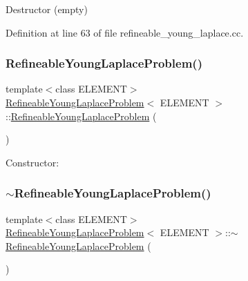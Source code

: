 Destructor (empty) 



Definition at line 63 of file refineable\+\_\+young\+\_\+laplace.\+cc.

\mbox{\label{classRefineableYoungLaplaceProblem_a78f77a299f2770a82378fcccf86a0b71}} 
\subsubsection{\texorpdfstring{Refineable\+Young\+Laplace\+Problem()}{RefineableYoungLaplaceProblem()}\hspace{0.1cm}{\footnotesize\ttfamily [3/3]}}
{\footnotesize\ttfamily template$<$class E\+L\+E\+M\+E\+NT$>$ \\
\hyperlink{classRefineableYoungLaplaceProblem}{Refineable\+Young\+Laplace\+Problem}$<$ E\+L\+E\+M\+E\+NT $>$\+::\hyperlink{classRefineableYoungLaplaceProblem}{Refineable\+Young\+Laplace\+Problem} (\begin{DoxyParamCaption}{ }\end{DoxyParamCaption})}



Constructor\+: 

\mbox{\label{classRefineableYoungLaplaceProblem_a24b45d5ecdd1d7dbb678e7f74777bf41}} 
\subsubsection{\texorpdfstring{$\sim$\+Refineable\+Young\+Laplace\+Problem()}{~RefineableYoungLaplaceProblem()}\hspace{0.1cm}{\footnotesize\ttfamily [3/3]}}
{\footnotesize\ttfamily template$<$class E\+L\+E\+M\+E\+NT$>$ \\
\hyperlink{classRefineableYoungLaplaceProblem}{Refineable\+Young\+Laplace\+Problem}$<$ E\+L\+E\+M\+E\+NT $>$\+::$\sim$\hyperlink{classRefineableYoungLaplaceProblem}{Refineable\+Young\+Laplace\+Problem} (\begin{DoxyParamCaption}{ }\end{DoxyParamCaption})\hspace{0.3cm}{\ttfamily [inline]}}



